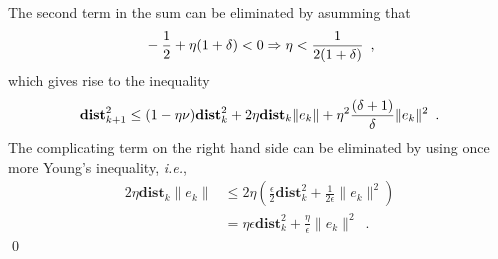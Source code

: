 \documentclass[envcountsect]{svjour3}
\newcommand{\ie}{{\it i.e.}}
\newcommand{\dist}{{\mathbf{dist} }}
\begin{document}
The second term in the sum can be eliminated by asumming that
\begin{equation}{\label{eq::rhoFirstBound}}
 -\frac{1}{2}+\eta(1+\delta)<0\Rightarrow \eta<\frac{1}{2(1+\delta)}\enspace,
\end{equation}
which gives rise to the inequality
\begin{equation}{\label{eq::inequality6}}
 \dist_{k+1}^2 \leq (1-\eta\nu)\dist_k^2
                            +2\eta\dist_k\|e_k\|
                            +\eta^2\frac{(\delta+1)}{\delta}\|e_k\|^2
                                   \enspace.
\end{equation}
The complicating term on the right hand side can be eliminated by using once more Young's inequality, \ie,
\begin{align*}
 2\eta\dist_k\|e_k\| &
                     \leq 2\eta\left(\frac{\epsilon}{2}\dist_k^2+\frac{1}{2\epsilon}\|e_k\|^2\right)\\
                               &= \eta\epsilon\dist_k^2+\frac{\eta}{\epsilon}\|e_k\|^2\enspace.
\end{align*}
\qed


\end{document}
